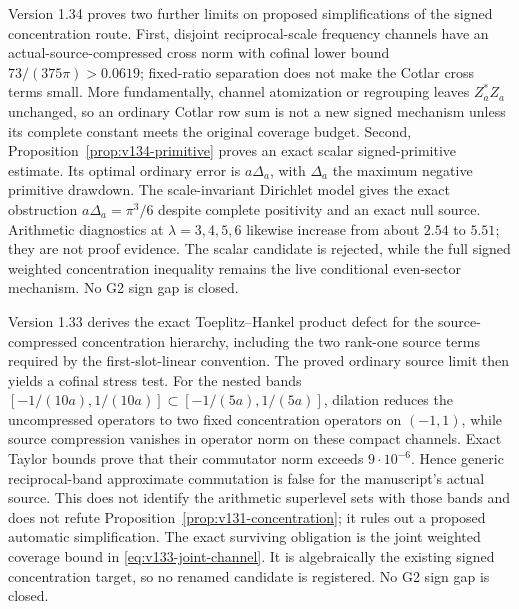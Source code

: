 \documentclass[11pt]{article}
\theoremstyle{remark}
\begin{document}
Version 1.34 proves two further limits on proposed simplifications of
the signed concentration route.  First, disjoint reciprocal-scale
frequency channels have an actual-source-compressed cross norm with
cofinal lower bound $73/(375\pi)>0.0619$; fixed-ratio separation does
not make the Cotlar cross terms small.  More fundamentally, channel
atomization or regrouping leaves $Z_a^*Z_a$ unchanged, so an ordinary
Cotlar row sum is not a new signed mechanism unless its complete
constant meets the original coverage budget.  Second,
Proposition~\ref{prop:v134-primitive} proves an exact scalar
signed-primitive estimate.  Its optimal ordinary error is
$a\Delta_a$, with $\Delta_a$ the maximum negative primitive drawdown.
The scale-invariant Dirichlet model gives the exact obstruction
$a\Delta_a=\pi^3/6$ despite complete positivity and an exact null
source.  Arithmetic diagnostics at $\lambda=3,4,5,6$ likewise increase
from about $2.54$ to $5.51$; they are not proof evidence.  The scalar
candidate is rejected, while the full signed weighted concentration
inequality remains the live conditional even-sector mechanism.  No G2
sign gap is closed.

Version 1.33 derives the exact Toeplitz--Hankel product defect for the
source-compressed concentration hierarchy, including the two rank-one
source terms required by the first-slot-linear convention.  The proved
ordinary source limit then yields a cofinal stress test.  For the nested
bands $[-1/(10a),1/(10a)]\subset[-1/(5a),1/(5a)]$, dilation reduces the
uncompressed operators to two fixed concentration operators on
$(-1,1)$, while source compression vanishes in operator norm on these
compact channels.  Exact Taylor bounds prove that their commutator norm
exceeds $9\cdot10^{-6}$.  Hence generic reciprocal-band approximate
commutation is false for the manuscript's actual source.  This does not
identify the arithmetic superlevel sets with those bands and does not
refute Proposition~\ref{prop:v131-concentration}; it rules out a proposed
automatic simplification.  The exact surviving obligation is the joint
weighted coverage bound in \eqref{eq:v133-joint-channel}.  It is
algebraically the existing signed concentration target, so no renamed
candidate is registered.  No G2 sign gap is closed.
\end{document}
